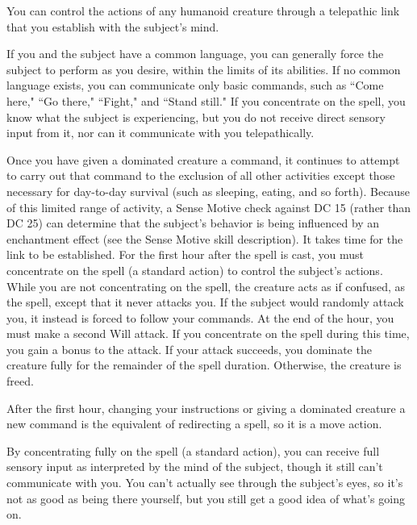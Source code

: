 \begin{spelleffect}
    You can control the actions of any humanoid creature through a telepathic link that you establish with the subject's mind.
    \par If you and the subject have a common language, you can generally force the subject to perform as you desire, within the limits of its abilities. If no common language exists, you can communicate only basic commands, such as ``Come here," ``Go there," ``Fight," and ``Stand still." If you concentrate on the spell, you know what the subject is experiencing, but you do not receive direct sensory input from it, nor can it communicate with you telepathically.
    \par Once you have given a dominated creature a command, it continues to attempt to carry out that command to the exclusion of all other activities except those necessary for day-to-day survival (such as sleeping, eating, and so forth). Because of this limited range of activity, a Sense Motive check against DC 15 (rather than DC 25) can determine that the subject's behavior is being influenced by an enchantment effect (see the Sense Motive skill description).
    It takes time for the link to be established. For the first hour after the spell is cast, you must concentrate on the spell (a standard action) to control the subject's actions. While you are not concentrating on the spell, the creature acts as if confused, as the  spell, except that it never attacks you. If the subject would randomly attack you, it instead is forced to follow your commands. At the end of the hour, you must make a second Will attack. If you concentrate on the spell during this time, you gain a  bonus to the attack. If your attack succeeds, you dominate the creature fully for the remainder of the spell duration. Otherwise, the creature is freed.
    \par After the first hour, changing your instructions or giving a dominated creature a new command is the equivalent of redirecting a spell, so it is a move action.
    \par By concentrating fully on the spell (a standard action), you can receive full sensory input as interpreted by the mind of the subject, though it still can't communicate with you. You can't actually see through the subject's eyes, so it's not as good as being there yourself, but you still get a good idea of what's going on.

\end{spelleffect}
